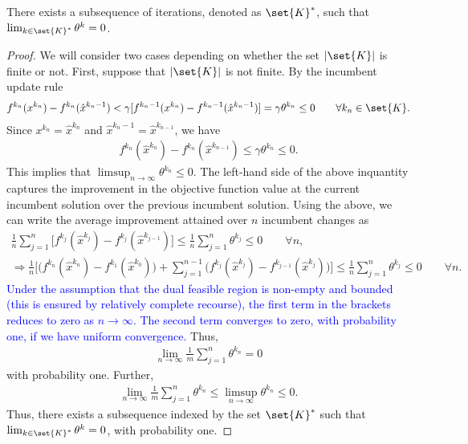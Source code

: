 \documentclass[11pt]{article}
\begin{document}
\begin{lemma}
There exists a subsequence of iterations, denoted as $\set{K}^*$, such that $\lim_{k \in \set{K}^*} \theta^k = 0$.
\end{lemma} \label{lemma:vanishingError}
\begin{proof} We will consider two cases depending on whether the set $|\set{K}|$ is finite or not. First, suppose that $|\set{K}|$ is not finite. By the incumbent update rule
\begin{align*}
    f^{k_n}(x^{k_n}) - f^{k_n}(\hat{x}^{k_n-1}) < \gamma [f^{k_n-1}(x^{k_n}) - f^{{k_n}-1}(\hat{x}^{k_n-1})] = \gamma \theta^{k_n} \leq 0 \qquad \forall k_n \in \set{K}.
\end{align*}
Since $x^{k_n} = \hat{x}^{k_n}$ and $\hat{x}^{k_n-1} = \hat{x}^{k_{n-1}}$, we have
\begin{align*}
    f^{k_n}(\hat{x}^{k_n}) - f^{k_n}(\hat{x}^{k_{n-1}}) \leq \gamma \theta^{k_n} \leq 0. 
\end{align*}
This implies that $\limsup_{n \rightarrow \infty} \theta^{k_n} \leq 0$. The left-hand side of the above inquantity captures the improvement in the objective function value at the current incumbent solution over the previous incumbent solution. Using the above, we can write the average improvement attained over $n$ incumbent changes as
\begin{align*}
    \frac{1}{n} \sum_{j = 1}^n \bigg[f^{k_j}(\hat{x}^{k_j}) - f^{k_j}(\hat{x}^{k_{j-1}}) \bigg] \leq \frac{1}{n} \sum_{j = 1}^n \theta^{k_j} \leq 0 \qquad \forall n, \\
    \Rightarrow \frac{1}{n}\bigg[\bigg(f^{k_n}(\hat{x}^{k_n}) - f^{k_1}(\hat{x}^{k_0}) \bigg)+ \sum_{j=1}^{n-1} \bigg(f^{k_j}(\hat{x}^{k_j}) - f^{k_{j-1}}(\hat{x}^{k_j}) \bigg) \bigg]  \leq \frac{1}{n} \sum_{j = 1}^n \theta^{k_j} \leq 0 \qquad \forall n.
\end{align*}
\textcolor{blue}{Under the assumption that the dual feasible region is non-empty and bounded (this is ensured by relatively complete recourse), the first term in the brackets reduces to zero as $n \rightarrow \infty$. The second term converges to zero, with probability one, if we have uniform convergence.} Thus,
\begin{align*}
    \lim_{n \rightarrow \infty} \frac{1}{m} \sum_{j = 1}^n \theta^{k_n} = 0
\end{align*}
with probability one. Further,
\begin{align*}
    \lim_{n \rightarrow \infty} \frac{1}{m} \sum_{j = 1}^n \theta^{k_n} \leq \limsup_{n \rightarrow \infty} \theta^{k_n} \leq 0.
\end{align*}
Thus, there exists a subsequence indexed by the set $\set{K}^*$ such that $\lim_{k \in \set{K}^*} \theta^k = 0$, with probability one.  


\end{proof}
\end{document}
